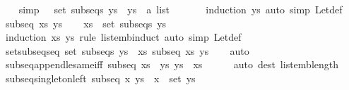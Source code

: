 \begin{isabellebody}
\isamarkupfalse%
\isanewline
\ \ \isamarkupfalse%
\ {\isacharbrackleft}simp{\isacharbrackright}{\isacharcolon}\ {\isachardoublequoteopen}{\isacharbrackleft}{\isacharbrackright}\ {\isasymin}\ set\ {\isacharparenleft}subseqs\ ys{\isacharparenright}{\isachardoublequoteclose}\ \ ys\ {\isacharcolon}{\isacharcolon}\ {\isachardoublequoteopen}{\isacharprime}a\ list{\isachardoublequoteclose}\ \isanewline
\ \ \ \ \isamarkupfalse%
\ {\isacharparenleft}induction\ ys{\isacharparenright}\ {\isacharparenleft}auto\ simp{\isacharcolon}\ Let{\isacharunderscore}def{\isacharparenright}\isanewline
\ \ \isamarkupfalse%
\ {\isachardoublequoteopen}subseq\ xs\ ys{\isachardoublequoteclose}\isanewline
\ \ \isamarkupfalse%
\ {\isachardoublequoteopen}xs\ {\isasymin}\ set\ {\isacharparenleft}subseqs\ ys{\isacharparenright}{\isachardoublequoteclose}\isanewline
\ \ \ \ \isamarkupfalse%
\ {\isacharparenleft}induction\ xs\ ys\ rule{\isacharcolon}\ list{\isacharunderscore}emb{\isachardot}induct{\isacharparenright}\ {\isacharparenleft}auto\ simp{\isacharcolon}\ Let{\isacharunderscore}def{\isacharparenright}\isanewline
{}\isamarkupfalse%
%
\endisatagproof
{\isafoldproof}%
%
\isadelimproof
\isanewline
%
\endisadelimproof
\isanewline
{}\isamarkupfalse%
\ set{\isacharunderscore}subseqs{\isacharunderscore}eq{\isacharcolon}\ {\isachardoublequoteopen}set\ {\isacharparenleft}subseqs\ ys{\isacharparenright}\ {\isacharequal}\ {\isacharbraceleft}xs{\isachardot}\ subseq\ xs\ ys{\isacharbraceright}{\isachardoublequoteclose}\isanewline
%
\isadelimproof
\ \ %
\endisadelimproof
%
\isatagproof
{}\isamarkupfalse%
\ auto%
\endisatagproof
{\isafoldproof}%
%
\isadelimproof
\isanewline
%
\endisadelimproof
\isanewline
{}\isamarkupfalse%
\ subseq{\isacharunderscore}append{\isacharunderscore}le{\isacharunderscore}same{\isacharunderscore}iff{\isacharcolon}\ {\isachardoublequoteopen}subseq\ {\isacharparenleft}xs\ {\isacharat}\ ys{\isacharparenright}\ ys\ {\isasymlongleftrightarrow}\ xs\ {\isacharequal}\ {\isacharbrackleft}{\isacharbrackright}{\isachardoublequoteclose}\isanewline
%
\isadelimproof
\ \ %
\endisadelimproof
%
\isatagproof
{}\isamarkupfalse%
\ {\isacharparenleft}auto\ dest{\isacharcolon}\ list{\isacharunderscore}emb{\isacharunderscore}length{\isacharparenright}%
\endisatagproof
{\isafoldproof}%
%
\isadelimproof
\isanewline
%
\endisadelimproof
\isanewline
{}\isamarkupfalse%
\ subseq{\isacharunderscore}singleton{\isacharunderscore}left{\isacharcolon}\ {\isachardoublequoteopen}subseq\ {\isacharbrackleft}x{\isacharbrackright}\ ys\ {\isasymlongleftrightarrow}\ x\ {\isasymin}\ set\ ys{\isachardoublequoteclose}\isanewline

\end{isabellebody}
